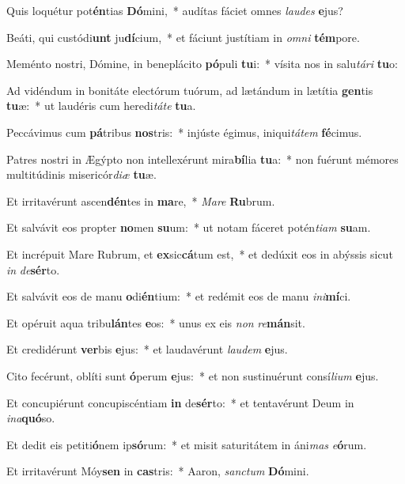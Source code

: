 \item Quis loquétur pot\textbf{én}tias \textbf{Dó}mini,~* audítas fáciet omnes \textit{lau}\textit{des} \textbf{e}jus?
\item Beáti, qui custódi\textbf{unt} ju\textbf{dí}cium,~* et fáciunt justítiam in \textit{om}\textit{ni} \textbf{tém}pore.
\item Meménto nostri, Dómine, in beneplácito \textbf{pó}puli \textbf{tu}i:~* vísita nos in salu\textit{tá}\textit{ri} \textbf{tu}o:
\item Ad vidéndum in bonitáte electórum tuórum, ad lætándum in lætítia \textbf{gen}tis \textbf{tu}æ:~* ut laudéris cum heredi\textit{tá}\textit{te} \textbf{tu}a.
\item Peccávimus cum \textbf{pá}tribus \textbf{nos}tris:~* injúste égimus, iniqui\textit{tá}\textit{tem} \textbf{fé}cimus.
\item Patres nostri in Ægýpto non intellexérunt mira\textbf{bí}lia \textbf{tu}a:~* non fuérunt mémores multitúdinis misericór\textit{di}\textit{æ} \textbf{tu}æ.
\item Et irritavérunt ascen\textbf{dén}tes in \textbf{ma}re,~* \textit{Ma}\textit{re} \textbf{Ru}brum.
\item Et salvávit eos propter \textbf{no}men \textbf{su}um:~* ut notam fáceret potén\textit{ti}\textit{am} \textbf{su}am.
\item Et incrépuit Mare Rubrum, et \textbf{ex}sic\textbf{cá}tum est,~* et dedúxit eos in abýssis sicut \textit{in} \textit{de}\textbf{sér}to.
\item Et salvávit eos de manu \textbf{o}di\textbf{én}tium:~* et redémit eos de manu \textit{in}\textit{i}\textbf{mí}ci.
\item Et opéruit aqua tribu\textbf{lán}tes \textbf{e}os:~* unus ex eis \textit{non} \textit{re}\textbf{mán}sit.
\item Et credidérunt \textbf{ver}bis \textbf{e}jus:~* et laudavérunt \textit{lau}\textit{dem} \textbf{e}jus.
\item Cito fecérunt, oblíti sunt \textbf{ó}perum \textbf{e}jus:~* et non sustinuérunt consí\textit{li}\textit{um} \textbf{e}jus.
\item Et concupiérunt concupiscéntiam \textbf{in} de\textbf{sér}to:~* et tentavérunt Deum in \textit{in}\textit{a}\textbf{quó}so.
\item Et dedit eis petiti\textbf{ó}nem ip\textbf{só}rum:~* et misit saturitátem in áni\textit{mas} \textit{e}\textbf{ó}rum.
\item Et irritavérunt Móy\textbf{sen} in \textbf{cas}tris:~* Aaron, \textit{sanc}\textit{tum} \textbf{Dó}mini.

